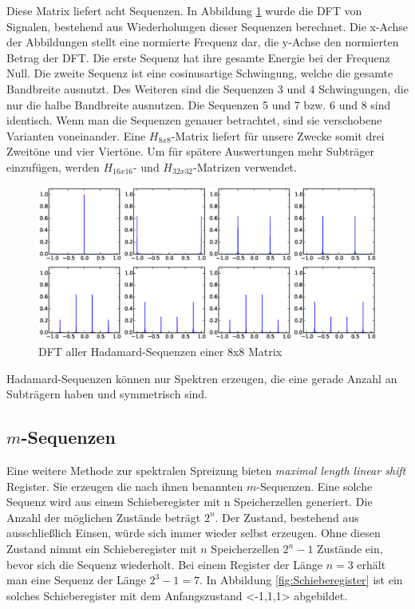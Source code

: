 Diese Matrix liefert acht Sequenzen. In Abbildung \ref{fig:Hadamarspektren} wurde die \gls{DFT} von Signalen, bestehend aus Wiederholungen dieser Sequenzen berechnet. Die x-Achse der Abbildungen stellt eine normierte Frequenz dar, die y-Achse den normierten Betrag der \gls{DFT}. Die erste Sequenz hat ihre gesamte Energie bei der Frequenz Null. Die zweite Sequenz ist eine cosinusartige Schwingung, welche die gesamte Bandbreite ausnutzt. Des Weiteren sind die Sequenzen 3 und 4 Schwingungen, die nur die halbe Bandbreite ausnutzen. Die Sequenzen 5 und 7 bzw. 6 und 8 sind identisch. Wenn man die Sequenzen genauer betrachtet, sind sie verschobene Varianten voneinander. Eine $H_{8x8}$-Matrix liefert für unsere Zwecke somit drei Zweitöne und vier Viertöne. Um für spätere Auswertungen mehr Subträger einzufügen, werden $H_{16x16}$- und $H_{32x32}$-Matrizen verwendet. 

\begin{figure}[htbp]
	\centering
	\includegraphics[width = \textwidth]{images/Hadamardspektren}
	\caption{DFT aller Hadamard-Sequenzen einer 8x8 Matrix}
	\label{fig:Hadamarspektren}
\end{figure}

Hadamard-Sequenzen können nur Spektren erzeugen, die eine gerade Anzahl an Subträgern haben und symmetrisch sind. 

\subsection{$m$-Sequenzen}
\label{chap2.4.2:m}
Eine weitere Methode zur spektralen Spreizung bieten \emph{maximal length linear shift} Register. Sie erzeugen die nach ihnen benannten $m$-Sequenzen. Eine solche Sequenz wird aus einem Schieberegister mit n Speicherzellen generiert. Die Anzahl der möglichen Zustände beträgt $2^n$. Der Zustand, bestehend aus ausschließlich Einsen, würde sich immer wieder selbst erzeugen. Ohne diesen Zustand nimmt ein Schieberegister mit $n$ Speicherzellen $2^n - 1$ Zustände ein, bevor sich die Sequenz wiederholt. Bei einem Register der Länge $n = 3$ erhält man eine Sequenz der Länge $2^3 - 1 = 7$. In Abbildung \ref{fig:Schieberegister} ist ein solches Schieberegister mit dem Anfangszustand <-1,1,1> abgebildet.  

